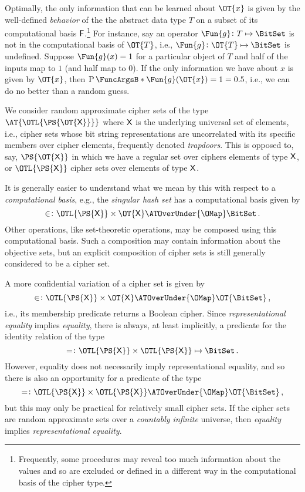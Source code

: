 \documentclass[ ../main.tex]{subfiles}
\begin{document}
Optimally, the only information that can be learned about $\OT{x}$ is given by the well-defined \emph{behavior} of the the abstract data type $T$ on a subset of its computational basis $\Set{F}$.\footnote{
Frequently, some procedures may reveal too much information about the values and so are excluded or defined in a different way in the computational basis of the cipher type.}
For instance, say an operator $\Fun{g} \colon T \mapsto \BitSet$ is not in the computational basis of $\OT{T}$, i.e., $\Fun{g} \colon \OT{T} \mapsto \BitSet$ is undefined.
Suppose $\Fun{g}(x) = 1$ for a particular object of $T$ and half of the inputs map to $1$ (and half map to $0$).
If the only information we have about $x$ is given by $\OT{x}$, then $\Prob{\Fun{g}(\OT{x})=1} = 0.5$, i.e., we can do no better than a random guess.

We consider random approximate cipher sets of the type $\AT{\OTL{\PS{\OT{\Set{X}}}}}$ where $\Set{X}$ is the underlying universal set of elements, i.e., cipher sets whose bit string representations are uncorrelated with its specific members over cipher elements, frequently denoted \emph{trapdoors}.
This is opposed to, say, $\PS{\OT{\Set{X}}}$ in which we have a regular set over ciphers elements of type $\Set{X}$, or $\OTL{\PS{\Set{X}}}$ cipher sets over elements of type $\Set{X}$.

It is generally easier to understand what we mean by this with respect to a \emph{computational basis}, e.g., the 
\emph{singular hash set} has a computational basis given by
\begin{equation}
	\SetContains \colon \OTL{\PS{\Set{X}}} \times \OT{\Set{X}} \ATOverUnder{\OMap} \BitSet\,.
\end{equation}
Other operations, like set-theoretic operations, may be composed using this computational basis.
Such a composition may contain information about the objective sets, but an explicit composition of cipher sets is still generally considered to be a cipher set.

A more confidential variation of a cipher set is given by
\begin{equation}
	\SetContains \colon \OTL{\PS{\Set{X}}} \times \OT{\Set{X}} \ATOverUnder{\OMap} \OT{\BitSet}\,,
\end{equation}
i.e., its membership predicate returns a Boolean cipher.
Since \emph{representational equality} implies \emph{equality}, there is always, at least implicitly, a predicate for the identity relation of the type
\begin{equation}
	= \colon \OTL{\PS{\Set{X}}} \times \OTL{\PS{\Set{X}}} \mapsto \BitSet\,.
\end{equation}
However, equality does not necessarily imply representational equality, and so there is also an opportunity for a predicate of the type
\begin{equation}
	= \colon \OTL{\PS{\Set{X}}} \times \OTL{\PS{\Set{X}}} \ATOverUnder{\OMap} \OT{\BitSet}\,,
\end{equation}
but this may only be practical for relatively small cipher sets.
If the cipher sets are random approximate sets over a \emph{countably infinite} universe, then \emph{equality} implies \emph{representational equality}.
\end{document}
